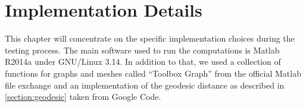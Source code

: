 \chapter{Implementation Details}
\label{chapter:implementation}

This chapter will concentrate on the specific implementation choices during the testing process.
The main software used to run the computations is Matlab R2014a under GNU/Linux 3.14.
In addition to that, we used a collection of functions for graphs and meshes called ``Toolbox Graph'' from the official Matlab file exchange and an implementation of the geodesic distance as described in \ref{section:geodesic} taken from Google Code.
